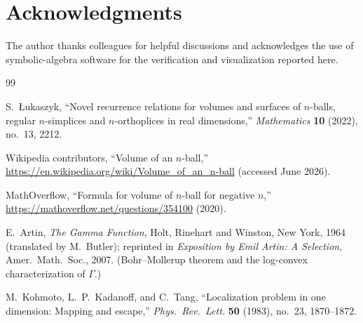 \documentclass[11pt,a4paper]{article}
\theoremstyle{definition}
\begin{document}
\section*{Acknowledgments}

The author thanks colleagues for helpful discussions and acknowledges the use of symbolic-algebra software for the verification and visualization reported here.


\begin{thebibliography}{99}

S.~Łukaszyk, ``Novel recurrence relations for volumes and surfaces of \(n\)-balls, regular \(n\)-simplices and \(n\)-orthoplices in real dimensions,'' \emph{Mathematics} \textbf{10} (2022), no.~13, 2212.

Wikipedia contributors, ``Volume of an \(n\)-ball,'' \url{https://en.wikipedia.org/wiki/Volume_of_an_n-ball} (accessed June 2026).

MathOverflow, ``Formula for volume of \(n\)-ball for negative \(n\),'' \url{https://mathoverflow.net/questions/354100} (2020).

E.~Artin, \emph{The Gamma Function}, Holt, Rinehart and Winston, New York, 1964 (translated by M.~Butler); reprinted in \emph{Exposition by Emil Artin: A Selection}, Amer.\ Math.\ Soc., 2007. (Bohr--Mollerup theorem and the log-convex characterization of \(\Gamma\).)

M.~Kohmoto, L.~P.~Kadanoff, and C.~Tang, ``Localization problem in one dimension: Mapping and escape,'' \emph{Phys.\ Rev.\ Lett.} \textbf{50} (1983), no.~23, 1870--1872.

\end{thebibliography}
\end{document}
